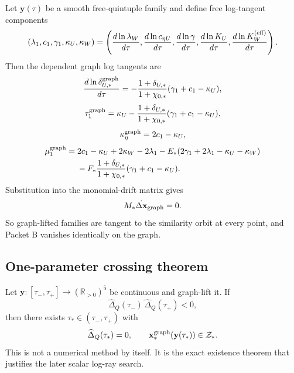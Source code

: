 Let \(\mathbf y(\tau)\) be a smooth free-quintuple family and define free log-tangent components
\begin{equation}
\label{eq:app-part06-free-log-tangent}
(\lambda_1,c_1,\gamma_1,\kappa_U,\kappa_W)
=
\left(
\frac{d\ln\lambda_W}{d\tau},
\frac{d\ln c_{\eta U}}{d\tau},
\frac{d\ln\gamma}{d\tau},
\frac{d\ln K_U}{d\tau},
\frac{d\ln K_W^{(\rm eff)}}{d\tau}
\right).
\end{equation}
Then the dependent graph log tangents are
\begin{equation}
\label{eq:app-part06-delta-graph-tangent}
\frac{d\ln\delta_{U,*}^{\rm graph}}{d\tau}
=-\frac{1+\delta_{U,*}}{1+\chi_{0,*}}(\gamma_1+c_1-\kappa_U),
\end{equation}
\begin{equation}
\label{eq:app-part06-T-graph-tangent}
\tau_1^{\rm graph}
=\kappa_U
-\frac{1+\delta_{U,*}}{1+\chi_{0,*}}(\gamma_1+c_1-\kappa_U),
\end{equation}
\begin{equation}
\label{eq:app-part06-Keta-graph-tangent}
\kappa_\eta^{\rm graph}=2c_1-\kappa_U,
\end{equation}
\begin{equation}
\label{eq:app-part06-mu-graph-tangent}
\begin{aligned}
\mu_1^{\rm graph}={}&
2c_1-\kappa_U+2\kappa_W-2\lambda_1
-E_*(2\gamma_1+2\lambda_1-\kappa_U-\kappa_W)\\
&-F_*\frac{1+\delta_{U,*}}{1+\chi_{0,*}}(\gamma_1+c_1-\kappa_U).
\end{aligned}
\end{equation}
Substitution into the monomial-drift matrix gives
\begin{equation}
\label{eq:app-part06-graph-tangent-kernel}
M_*\dot{\Delta\mathbf x}_{\rm graph}=0.
\end{equation}
So graph-lifted families are tangent to the similarity orbit at every point, and Packet B vanishes identically on the graph.

\subsection{One-parameter crossing theorem}
\label{subsec:app-part06-one-parameter-crossing-theorem}

Let \(\mathbf y:[\tau_-,\tau_+]\to(\mathbb R_{>0})^5\) be continuous and graph-lift it.  If
\begin{equation}
\label{eq:app-part06-IVT-crossing-condition}
\widehat\Delta_Q(\tau_-)\,\widehat\Delta_Q(\tau_+)<0,
\end{equation}
then there exists \(\tau_*\in(\tau_-,\tau_+)\) with
\begin{equation}
\label{eq:app-part06-IVT-crossing-result}
\widehat\Delta_Q(\tau_*)=0,
\qquad
\mathbf x_*^{\rm graph}(\mathbf y(\tau_*))\in\mathcal Z_*.
\end{equation}
This is not a numerical method by itself.  It is the exact existence theorem that justifies the later scalar log-ray search.

